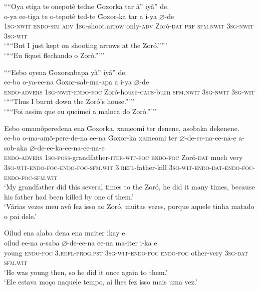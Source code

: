 \documentclass[output=paper,
modfonts,nonflat
]{langsci/langscibook}
\begin{document}
\ea ““Oya etiga te onepotê tedne \~{G}oxorka tar ã” iyã” de.\\[.3em]
\gll o-ya ee-tiga te o-tepotê ted-te \~{G}oxor-ka tar a i-ya \(\varnothing\)-de\\
\textsc{1sg-nwit} \textsc{endo-sim} \textsc{adv} \textsc{1sg}-shoot.arrow only-\textsc{adv} Zoró-\textsc{dat} \textsc{prf} \textsc{sfm.nwit} \textsc{3sg-nwit} \textsc{3sg-wit}\\
\glt ‘““But I just kept on shooting arrows at the Zoró.””’\\
\glt ‘““Eu fiquei flechando o Zoró.””’\\
\z

\newpage 
\ea ““Eebo oyena \~{G}oxorsabapa yã” iyã” de.\\[.3em]
\gll ee-bo o-ya-ee-na \~{G}oxor-sab-ma-apa a i-ya \(\varnothing\)-de\\
\textsc{endo-advers} \textsc{1sg-nwit-endo-foc} Zoró-house-\textsc{caus}-burn \textsc{sfm.nwit} \textsc{3sg-nwit} \textsc{3sg-wit}\\
\glt ‘““Thus I burnt down the Zoró's house.””’\\
\glt ‘““Foi assim que eu queimei a maloca do Zoró.””’\\
\z

\ea Eebo omamõperedena ena \~{G}oxorka, xameomi ter denene, asobaka dekenene.\\[.3em]
\gll ee-bo o-ma-amõ-pere-de-na ee-na \~{G}oxor-ka xameomi ter \(\varnothing\)-de-ee-na-ee-na-e a-sob-aka \(\varnothing\)-de-ee-ka-ee-na-ee-na-e\\
\textsc{endo-advers} \textsc{1sg-poss}-grandfather-\textsc{iter-wit-foc} \textsc{endo-foc} Zoró-\textsc{dat} much very \textsc{3sg-wit-endo-foc-endo-foc-sfm.wit} \textsc{3.refl}-father-kill \textsc{3sg-wit-endo-dat-endo-foc-endo-foc-sfm.wit}\\
\glt ‘My grandfather did this several times to the Zoró, he did it many times, because his father had been killed by one of them.’\\
\glt ‘Várias vezes meu avô fez isso ao Zoró, muitas vezes, porque aquele tinha matado o pai dele.’\\
\z

\ea Oilud ena alaba dena ena maiter ikay e.\\[.3em]
\gll oilud ee-na a-saba \(\varnothing\)-de-ee-na ee-na ma-iter{\footnotemark} i-ka e\\
young \textsc{endo-foc} \textsc{3.refl-prog.pst} \textsc{3sg-wit-endo-foc} \textsc{endo-foc} other-very \textsc{3sg-dat} \textsc{sfm.wit}\\
\glt ‘He was young then, so he did it once again to them.’\\
\glt ‘Ele estava moço naquele tempo, aí lhes fez isso mais uma vez.’\\
\z
\end{document}
